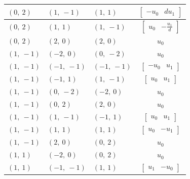 \documentclass[11pt]{article}
\theoremstyle{definition}
\begin{document}
\begin{longtable}{|l|l|l|c|}
    \hline
    $\left( 0, \  2\right)$ & $\left( 1, \  -1\right)$ & $\left( 1, \  1\right)$ & $\left[\begin{matrix}- u_{0} & d u_{1}\end{matrix}\right]$ \\
    \hline
    $\left( 0, \  2\right)$ & $\left( 1, \  1\right)$ & $\left( 1, \  -1\right)$ & $\left[\begin{matrix}u_{0} & - \frac{u_{1}}{d}\end{matrix}\right]$ \\
    \hline
    $\left( 0, \  2\right)$ & $\left( 2, \  0\right)$ & $\left( 2, \  0\right)$ & $u_{0}$ \\
    \hline
    $\left( 1, \  -1\right)$ & $\left( -2, \  0\right)$ & $\left( 0, \  -2\right)$ & $u_{0}$ \\
    \hline
    $\left( 1, \  -1\right)$ & $\left( -1, \  -1\right)$ & $\left( -1, \  -1\right)$ & $\left[\begin{matrix}- u_{0} & u_{1}\end{matrix}\right]$ \\
    \hline
    $\left( 1, \  -1\right)$ & $\left( -1, \  1\right)$ & $\left( 1, \  -1\right)$ & $\left[\begin{matrix}u_{0} & u_{1}\end{matrix}\right]$ \\
    \hline
    $\left( 1, \  -1\right)$ & $\left( 0, \  -2\right)$ & $\left( -2, \  0\right)$ & $u_{0}$ \\
    \hline
    $\left( 1, \  -1\right)$ & $\left( 0, \  2\right)$ & $\left( 2, \  0\right)$ & $u_{0}$ \\
    \hline
    $\left( 1, \  -1\right)$ & $\left( 1, \  -1\right)$ & $\left( -1, \  1\right)$ & $\left[\begin{matrix}u_{0} & u_{1}\end{matrix}\right]$ \\
    \hline
    $\left( 1, \  -1\right)$ & $\left( 1, \  1\right)$ & $\left( 1, \  1\right)$ & $\left[\begin{matrix}u_{0} & - u_{1}\end{matrix}\right]$ \\
    \hline
    $\left( 1, \  -1\right)$ & $\left( 2, \  0\right)$ & $\left( 0, \  2\right)$ & $u_{0}$ \\
    \hline
    $\left( 1, \  1\right)$ & $\left( -2, \  0\right)$ & $\left( 0, \  2\right)$ & $u_{0}$ \\
    \hline
    $\left( 1, \  1\right)$ & $\left( -1, \  -1\right)$ & $\left( 1, \  1\right)$ & $\left[\begin{matrix}u_{1} & - u_{0}\end{matrix}\right]$ \\

\end{longtable}
\end{document}
